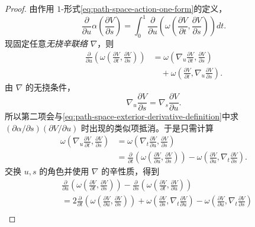 \begin{proof}
由作用 $1$-形式\eqref{eq:path-space-action-one-form}的定义，
\[
 \frac\partial{\partial u}\alpha\left(\frac{\partial V}{\partial s}\right)
 =\int_0^1\frac\partial{\partial u}
 \left(\omega\left(\frac{\partial V}{\partial t},
                         \frac{\partial V}{\partial s}\right)\right)dt.
\]
现固定任意\emph{无挠辛联络} $\nabla$，则
\[
\begin{aligned}
 \frac\partial{\partial u}
 \left(\omega\left(\frac{\partial V}{\partial t},
                         \frac{\partial V}{\partial s}\right)\right)
 &=\omega\left(\nabla_u\frac{\partial V}{\partial t},
                    \frac{\partial V}{\partial s}\right)\\
 &\quad+\omega\left(\frac{\partial V}{\partial t},
                    \nabla_u\frac{\partial V}{\partial s}\right).
\end{aligned}
\]
由 $\nabla$ 的无挠条件，
\[
 \nabla_u\frac{\partial V}{\partial s}
 =\nabla_s\frac{\partial V}{\partial u}.
\]
所以第二项会与\eqref{eq:path-space-exterior-derivative-definition}中求
$(\partial\alpha/\partial s)(\partial V/\partial u)$ 时出现的类似项抵消。于是只需计算
\[
\begin{aligned}
 \omega\left(\nabla_u\frac{\partial V}{\partial t},
                  \frac{\partial V}{\partial s}\right)
 &=\omega\left(\nabla_t\frac{\partial V}{\partial u},
                  \frac{\partial V}{\partial s}\right)\\
 &=\frac\partial{\partial t}
    \left(\omega\left(\frac{\partial V}{\partial u},
                          \frac{\partial V}{\partial s}\right)\right)
 -\omega\left(\frac{\partial V}{\partial u},
                  \nabla_t\frac{\partial V}{\partial s}\right).
\end{aligned}
\]
交换 $u,s$ 的角色并使用 $\nabla$ 的辛性质，得到
\[
\begin{aligned}
 &\frac\partial{\partial u}
   \left(\omega\left(\frac{\partial V}{\partial t},
                        \frac{\partial V}{\partial s}\right)\right)
 -\frac\partial{\partial s}
   \left(\omega\left(\frac{\partial V}{\partial t},
                        \frac{\partial V}{\partial u}\right)\right)\\
 &=2\frac\partial{\partial t}
   \left(\omega\left(\frac{\partial V}{\partial u},
                        \frac{\partial V}{\partial s}\right)\right)
 +\omega\left(\frac{\partial V}{\partial s},
                 \nabla_t\frac{\partial V}{\partial u}\right)
 -\omega\left(\frac{\partial V}{\partial u},
                 \nabla_t\frac{\partial V}{\partial s}\right)\\

\end{aligned}\]
\end{proof}
